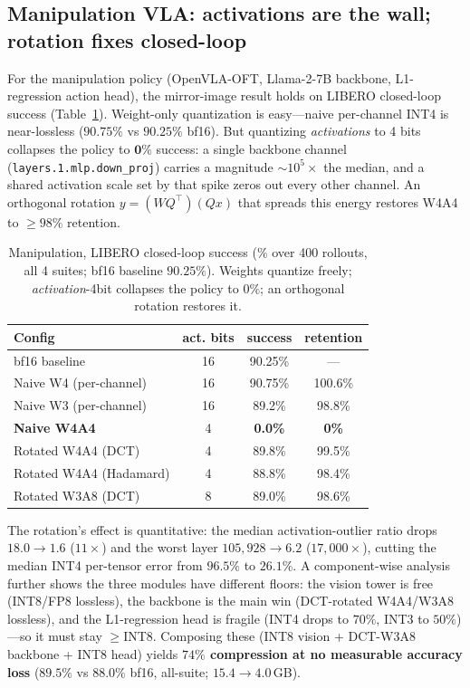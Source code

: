\documentclass[conference]{IEEEtran}
\begin{document}
\subsection{Manipulation VLA: activations are the wall; rotation fixes closed-loop}
For the manipulation policy (OpenVLA-OFT, Llama-2-7B backbone, L1-regression action head), the
mirror-image result holds on LIBERO closed-loop success (Table~\ref{tab:manip-libero}). Weight-only
quantization is easy---naive per-channel INT4 is near-lossless ($90.75\%$ vs $90.25\%$ bf16). But
quantizing \emph{activations} to 4 bits collapses the policy to $\mathbf{0\%}$ success: a single
backbone channel (\texttt{layers.1.mlp.down\_proj}) carries a magnitude $\sim\!10^{5}\times$ the
median, and a shared activation scale set by that spike zeros out every other channel. An orthogonal
rotation $y=(WQ^\top)(Qx)$ that spreads this energy restores W4A4 to $\ge 98\%$ retention.

\begin{table}[t]\centering
\caption{Manipulation, LIBERO closed-loop success (\% over 400 rollouts, all 4 suites; bf16
baseline $90.25\%$). Weights quantize freely; \emph{activation}-4bit collapses the policy to $0\%$; an
orthogonal rotation restores it.}
\label{tab:manip-libero}
\begin{tabular}{lccc}
\toprule
Config & act. bits & success & retention \\
\midrule
bf16 baseline            & 16 & 90.25\% & --- \\
Naive W4 (per-channel)   & 16 & 90.75\% & 100.6\% \\
Naive W3 (per-channel)   & 16 & 89.2\%  & 98.8\% \\
\textbf{Naive W4A4}      & 4  & \textbf{0.0\%} & \textbf{0\%} \\
Rotated W4A4 (DCT)       & 4  & 89.8\%  & 99.5\% \\
Rotated W4A4 (Hadamard)  & 4  & 88.8\%  & 98.4\% \\
Rotated W3A8 (DCT)       & 8  & 89.0\%  & 98.6\% \\
\bottomrule
\end{tabular}
\end{table}

The rotation's effect is quantitative: the median activation-outlier ratio drops $18.0\to1.6$
($11\times$) and the worst layer $105{,}928\to6.2$ ($17{,}000\times$), cutting the median INT4
per-tensor error from $96.5\%$ to $26.1\%$. A component-wise analysis further shows the three modules
have different floors: the vision tower is free (INT8/FP8 lossless), the backbone is the main win
(DCT-rotated W4A4/W3A8 lossless), and the L1-regression head is fragile (INT4 drops to $70\%$, INT3 to
$50\%$)---so it must stay $\ge$INT8. Composing these (INT8 vision + DCT-W3A8 backbone + INT8 head)
yields \textbf{$74\%$ compression at no measurable accuracy loss} ($89.5\%$ vs $88.0\%$ bf16,
all-suite; $15.4\to4.0$\,GB).
\end{document}
